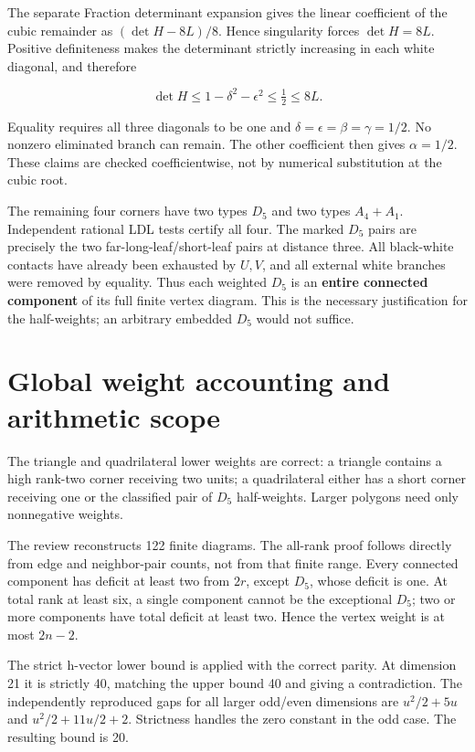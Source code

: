 \documentclass[
  10pt,
]{report}
\begin{document}
The separate Fraction determinant expansion gives the linear coefficient
of the cubic remainder as \((\det H-8L)/8\). Hence singularity forces
\(\det H=8L\). Positive definiteness makes the determinant strictly
increasing in each white diagonal, and therefore

\[
\det H\le1-\delta^2-\epsilon^2\le\tfrac12\le8L.
\]

Equality requires all three diagonals to be one and
\(\delta=\epsilon=\beta=\gamma=1/2\). No nonzero eliminated branch can
remain. The other coefficient then gives \(\alpha=1/2\). These claims
are checked coefficientwise, not by numerical substitution at the cubic
root.

The remaining four corners have two types \(D_5\) and two types
\(A_4+A_1\). Independent rational LDL tests certify all four. The marked
\(D_5\) pairs are precisely the two far-long-leaf/short-leaf pairs at
distance three. All black-white contacts have already been exhausted by
\(U,V\), and all external white branches were removed by equality. Thus
each weighted \(D_5\) is an \textbf{entire connected component} of its
full finite vertex diagram. This is the necessary justification for the
half-weights; an arbitrary embedded \(D_5\) would not suffice.

\section{Global weight accounting and arithmetic
scope}\label{global-weight-accounting-and-arithmetic-scope}

The triangle and quadrilateral lower weights are correct: a triangle
contains a high rank-two corner receiving two units; a quadrilateral
either has a short corner receiving one or the classified pair of
\(D_5\) half-weights. Larger polygons need only nonnegative weights.

The review reconstructs 122 finite diagrams. The all-rank proof follows
directly from edge and neighbor-pair counts, not from that finite range.
Every connected component has deficit at least two from \(2r\), except
\(D_5\), whose deficit is one. At total rank at least six, a single
component cannot be the exceptional \(D_5\); two or more components have
total deficit at least two. Hence the vertex weight is at most \(2n-2\).

The strict h-vector lower bound is applied with the correct parity. At
dimension 21 it is strictly 40, matching the upper bound 40 and giving a
contradiction. The independently reproduced gaps for all larger odd/even
dimensions are \(u^2/2+5u\) and \(u^2/2+11u/2+2\). Strictness handles
the zero constant in the odd case. The resulting bound is 20.
\end{document}
